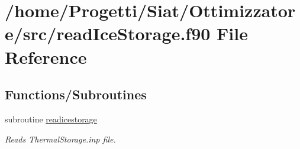 \hypertarget{read_ice_storage_8f90}{\section{/home/\-Progetti/\-Siat/\-Ottimizzatore/src/read\-Ice\-Storage.f90 File Reference}
\label{read_ice_storage_8f90}
}
\subsection*{Functions/\-Subroutines}
\begin{DoxyCompactItemize}
\item 
subroutine \hyperlink{read_ice_storage_8f90_a5e692f0dabfd18d22bc8a9b127b4dcc4}{readicestorage}
\begin{DoxyCompactList}\small\item\em Reads Thermal\-Storage.\-inp file. \end{DoxyCompactList}\end{DoxyCompactItemize}


